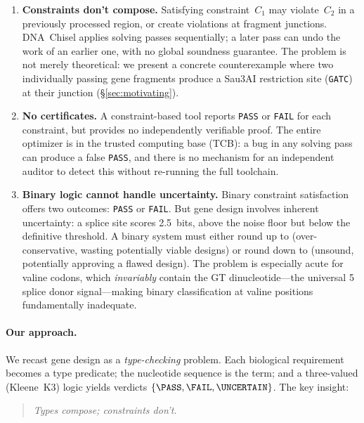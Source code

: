 \begin{enumerate}[leftmargin=*,itemsep=1pt,topsep=2pt]
\item \textbf{Constraints don't compose.}
Satisfying constraint~$C_1$ may violate~$C_2$ in a previously
processed region, or create violations at fragment junctions.
DNA~Chisel applies solving passes sequentially; a later pass can undo
the work of an earlier one, with no global soundness guarantee.
The problem is not merely theoretical: we present a concrete
counterexample where two individually passing gene fragments produce a
Sau3AI restriction site (\texttt{GATC}) at their junction
(\S\ref{sec:motivating}).

\item \textbf{No certificates.}
A constraint-based tool reports \texttt{PASS} or \texttt{FAIL} for
each constraint, but provides no independently verifiable proof.
The entire optimizer is in the trusted computing base (TCB): a bug in
any solving pass can produce a false \texttt{PASS}, and there is no
mechanism for an independent auditor to detect this without re-running
the full toolchain.

\item \textbf{Binary logic cannot handle uncertainty.}
Binary constraint satisfaction offers two outcomes:
\texttt{PASS} or \texttt{FAIL}.
But gene design involves inherent uncertainty: a splice site scores
2.5~bits, above the noise floor but below the definitive threshold.
A binary system must either round up to \FAIL{} (over-conservative,
wasting potentially viable designs) or round down to \PASS{}
(unsound, potentially approving a flawed design).
The problem is especially acute for valine codons, which
\emph{invariably} contain the GT dinucleotide---the universal
5\textquotesingle{} splice donor signal---making binary classification
at valine positions fundamentally inadequate.
\end{enumerate}

\paragraph{Our approach.}
We recast gene design as a \emph{type-checking} problem.
Each biological requirement becomes a type predicate; the nucleotide
sequence is the term; and a three-valued (Kleene~K3) logic yields
verdicts $\{\PASS, \FAIL, \UNCERTAIN\}$.
The key insight:

\begin{quote}
\emph{Types compose; constraints don't.}
\end{quote}

